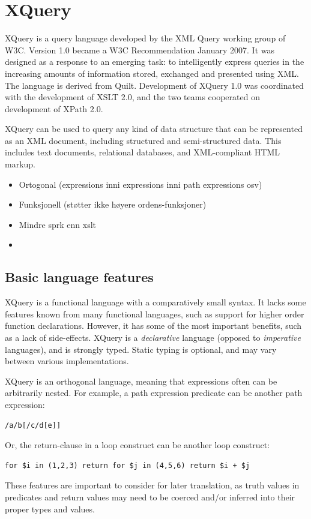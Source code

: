 \section{XQuery}
\label{sect:theory:xquery}

XQuery is a query language developed by the XML Query working group of W3C.
Version 1.0\cite{w3c00} became a W3C Recommendation January 2007. It was
designed as a response to an emerging task: to intelligently express queries in
the increasing amounts of information stored, exchanged and presented using
XML. The language is derived from Quilt\cite{quilt_queryLanguage}. Development
of XQuery 1.0 was coordinated with the development of XSLT 2.0, and the two
teams cooperated on development of XPath 2.0.

XQuery can be used to query any kind of data structure that can be represented
as an XML document, including structured and semi-structured data. This
includes text documents, relational databases, and XML-compliant HTML markup.

\begin{itemize}
  \item Ortogonal (expressions inni expressions inni path expressions osv)
  \item Funksjonell (st\o tter ikke h\o yere ordens-funksjoner)
  \item Mindre spr\a k enn xslt
  \item 
\end{itemize}


\subsection{Basic language features}
\label{sect:theory:xquery:basics}
XQuery is a functional language with a comparatively small syntax. It lacks
some features known from many functional languages, such as support for higher
order function declarations. However, it has some of the most important
benefits, such as a lack of side-effects. XQuery is a \textit{declarative}
language (opposed to \textit{imperative} languages), and is strongly typed.
Static typing is optional, and may vary between various implementations.


XQuery is an orthogonal language, meaning that expressions often can be
arbitrarily nested. For example, a path expression predicate can be another
path expression:
  \begin{verbatim}
/a/b[/c/d[e]]
  \end{verbatim}
Or, the return-clause in a loop construct can be another loop
construct:
  \begin{verbatim}
for $i in (1,2,3) return for $j in (4,5,6) return $i + $j
  \end{verbatim}
These features are important to consider for later translation, as truth values
in predicates and return values may need to be coerced and/or inferred into
their proper types and values.

